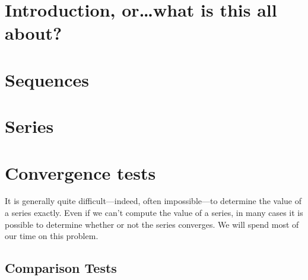 \documentclass[justified]{tufte-book}
\begin{document}
\chapter*{Introduction, or\ldots what is this all about?}



\chapter{Sequences}
\label{chapter:sequences}




\chapter{Series}
\label{chapter:series}

 


\chapter{Convergence tests}
\label{chapter:convergence-tests}


It is generally quite difficult---indeed, often impossible---to
determine the value of a series exactly.  Even if we can't compute the
value of a series, in many cases it is possible to determine whether
or not the series converges. We will spend most of our time on this
problem.

\section{Comparison Tests}

\end{document}
